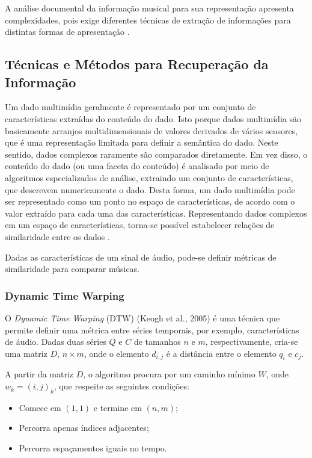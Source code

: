 A análise documental da informação musical para sua representação apresenta complexidades, pois exige diferentes técnicas de extração de informações para distintas formas de apresentação \cite{downie2003}.

\subsection{Técnicas e Métodos para Recuperação da Informação}

Um dado multimídia geralmente é representado por um conjunto de características extraídas do conteúdo do dado. Isto porque dados multimídia são basicamente arranjos multidimensionais de valores derivados de vários sensores, que é uma representação limitada para definir a semântica do dado. Neste sentido, dados complexos raramente são comparados diretamente. Em vez disso, o conteúdo do dado (ou uma faceta do conteúdo) é analisado por meio de algoritmos especializados de análise, extraindo um conjunto de características, que descrevem numericamente o dado. Desta forma, um dado multimídia pode ser representado como um ponto no espaço de características, de acordo com o valor extraído para cada uma das características. Representando dados complexos em um espaço de características, torna-se possível estabelecer relações de similaridade entre os dados \cite{kaster2012}.

Dadas as características de um sinal de áudio, pode-se definir métricas de similaridade para comparar músicas.

\subsubsection{Dynamic Time Warping}

O \textit{Dynamic Time Warping} (DTW) (Keogh et al., 2005) é uma técnica que permite definir uma métrica entre séries temporais, por exemplo, características de áudio. Dadas duas séries \({Q}\) e \({C}\) de tamanhos \({n}\) e \({m}\), respectivamente, cria-se uma matriz \({D}\), \({n\times m}\), onde o elemento \({d_{i,j}}\) é a distância entre o elemento \({q_{i}}\) e \({c_{j}}\).

A partir da matriz \({D}\), o algoritmo procura por um caminho mínimo \({W}\), onde \({w_{k} = (i,j)_{k}}\), que respeite as seguintes condições:

\begin{itemize}
    \item Comece em \({(1,1)}\) e termine em \({(n,m)}\);
    \item Percorra apenas índices adjacentes;
    \item Percorra espaçamentos iguais no tempo.
\end{itemize}


